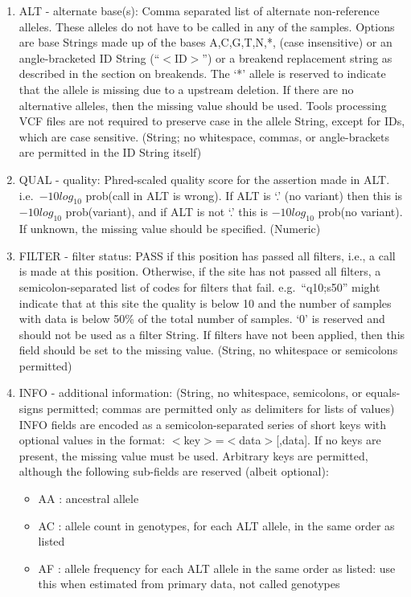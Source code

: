 \documentclass[8pt]{article}
\begin{document}
\begin{enumerate}
  \item ALT - alternate base(s): Comma separated list of alternate non-reference alleles.  These alleles do not have to be called in any of the samples. Options are base Strings made up of the bases A,C,G,T,N,*, (case insensitive) or an angle-bracketed ID String (``$<$ID$>$'') or a breakend replacement string as described in the section on breakends. The `*' allele is reserved to indicate that the allele is missing due to a upstream deletion. If there are no alternative alleles, then the missing value should be used.  Tools processing VCF files are not required to preserve case in the allele String, except for IDs, which are case sensitive.  (String; no whitespace, commas, or angle-brackets are permitted in the ID String itself)
  \item QUAL - quality: Phred-scaled quality score for the assertion made in ALT. i.e.\ $-10log_{10}$ prob(call in ALT is wrong). If ALT is `.' (no variant) then this is $-10log_{10}$ prob(variant), and if ALT is not `.' this is $-10log_{10}$ prob(no variant). If unknown, the missing value should be specified. (Numeric)
  \item FILTER - filter status: PASS if this position has passed all filters, i.e., a call is made at this position. Otherwise, if the site has not passed all filters, a semicolon-separated list of codes for filters that fail. e.g.\ ``q10;s50'' might indicate that at this site the quality is below 10 and the number of samples with data is below 50\% of the total number of samples. `0' is reserved and should not be used as a filter String. If filters have not been applied, then this field should be set to the missing value. (String, no whitespace or semicolons permitted)
  \item INFO - additional information: (String, no whitespace, semicolons, or equals-signs permitted; commas are permitted only as delimiters for lists of values) INFO fields are encoded as a semicolon-separated series of short keys with optional values in the format: $<$key$>$=$<$data$>$[,data]. If no keys are present, the missing value must be used. Arbitrary keys are permitted, although the following sub-fields are reserved (albeit optional):
\begin{itemize}
  \item AA : ancestral allele
  \item AC : allele count in genotypes, for each ALT allele, in the same order as listed
  \item AF : allele frequency for each ALT allele in the same order as listed: use this when estimated from primary data, not called genotypes

\end{itemize}
\end{enumerate}
\end{document}
